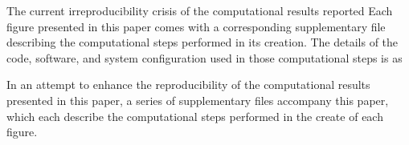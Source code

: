 The current irreproducibility crisis  of the computational results reported 
Each figure presented in this paper comes with a corresponding supplementary file describing the computational steps performed in its creation. The details of the code, software, and system configuration used in those computational steps is as


In an attempt to enhance the reproducibility of the computational results presented in this paper, a series of supplementary files accompany this paper, which each describe the computational steps performed in the create of each figure.    